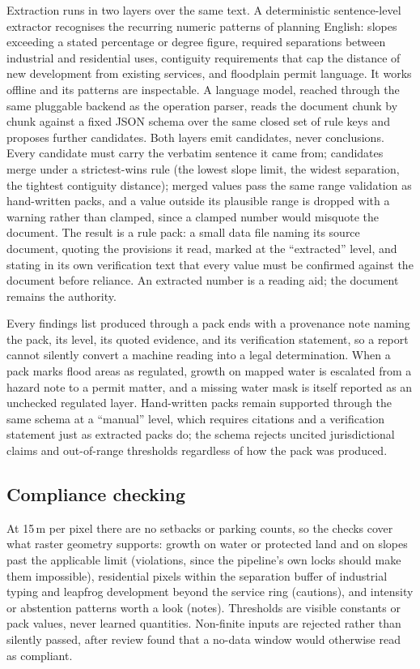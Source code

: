 \documentclass[11pt]{article}
\begin{document}
Extraction runs in two layers over the same text. A deterministic
sentence-level extractor recognises the recurring numeric patterns of
planning English: slopes exceeding a stated percentage or degree
figure, required separations between industrial and residential uses,
contiguity requirements that cap the distance of new development from
existing services, and floodplain permit language. It works offline
and its patterns are inspectable. A language model, reached through
the same pluggable backend as the operation parser, reads the document
chunk by chunk against a fixed JSON schema over the same closed set of
rule keys and proposes further candidates. Both layers emit
candidates, never conclusions. Every candidate must carry the verbatim
sentence it came from; candidates merge under a strictest-wins rule
(the lowest slope limit, the widest separation, the tightest
contiguity distance); merged values pass the same range validation as
hand-written packs, and a value outside its plausible range is dropped
with a warning rather than clamped, since a clamped number would
misquote the document. The result is a rule pack: a small data file
naming its source document, quoting the provisions it read, marked at
the ``extracted'' level, and stating in its own verification text that
every value must be confirmed against the document before reliance.
An extracted number is a reading aid; the document remains the
authority.

Every findings list produced through a pack ends with a provenance
note naming the pack, its level, its quoted evidence, and its
verification statement, so a report cannot silently convert a machine
reading into a legal determination. When a pack marks flood areas as
regulated, growth on mapped water is escalated from a hazard note to a
permit matter, and a missing water mask is itself reported as an
unchecked regulated layer. Hand-written packs remain supported through
the same schema at a ``manual'' level, which requires citations and a
verification statement just as extracted packs do; the schema rejects
uncited jurisdictional claims and out-of-range thresholds regardless
of how the pack was produced.

\subsection{Compliance checking}
At 15\,m per pixel there are no setbacks or parking counts, so the
checks cover what raster geometry supports: growth on water or
protected land and on slopes past the applicable limit (violations,
since the pipeline's own locks should make them impossible),
residential pixels within the separation buffer of industrial typing
and leapfrog development beyond the service ring (cautions), and
intensity or abstention patterns worth a look (notes). Thresholds are
visible constants or pack values, never learned quantities. Non-finite
inputs are rejected rather than silently passed, after review found
that a no-data window would otherwise read as compliant.
\end{document}
